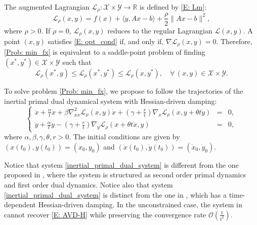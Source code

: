 \documentclass[pdflatex,sn-mathphys-num]{sn-jnl}
\theoremstyle{thmstyleone}
\theoremstyle{thmstyletwo}
\theoremstyle{thmstylethree}
\newcommand{\R}{\mathbb{R}}
\newcommand{\X}{\mathcal{X}}
\newcommand{\Y}{\mathcal{Y}}
\begin{document}
The augmented Lagrangian $\mathcal{L}_\rho:\X\times\Y\to\R$ is defined by \eqref{E: Lm}:
$$ \mathcal{L}_\rho(x,y) = f(x) + \langle y, Ax-b \rangle + \frac{\rho}{2}\| Ax-b \|^2, $$
where $\rho>0$. If $\rho=0$, $\mathcal{L}_\rho(x,y)$ reduces to the regular Lagrangian $\mathcal{L}(x,y)$. A point $(x,y)$ satisfies \eqref{E: opt_cond} if, and only if, $\nabla\mathcal{L}_\rho(x,y)=0$. Therefore, \eqref{Prob: min_fx} is equivalent to a saddle-point problem of finding $(x^*,y^*)\in\X\times\Y$ such that
$$ \mathcal{L}_\rho(x^*,y) \le \mathcal{L}_\rho(x^*,y^*) \le \mathcal{L}_\rho(x,y^*),\quad \forall\, (x,y)\in\X\times\Y.$$


To solve problem \eqref{Prob: min_fx}, we propose to follow the trajectories of the inertial primal dual dynamical system with Hessian-driven damping:  
\begin{equation}\label{inertial_primal_dual_system}\tag{PD-AVD-H}
\left\{
\begin{array}{rcl}
\ddot{x} + \frac{\alpha}{t}\dot{x} + \beta\nabla^2_{xx}\mathcal{L}_\rho \left( x, y \right) \dot{x} 
 + \left( \gamma + \frac{r}{t} \right) \nabla_x \mathcal{L}_\rho\left( x, y + \theta t \dot{y} \right) &=& 0, \\[2pt]
\ddot{y} + \frac{\alpha}{t}\dot{y} - \left( \gamma + \frac{r}{t} \right) \nabla_y \mathcal{L}_\rho\left( x + \theta t \dot{x}, y \right) &=& 0,
\end{array}
\right.
\end{equation}
where $\alpha,\beta,\gamma,\theta,r > 0$. The initial conditions are given by $\left( x(t_0), y(t_0) \right) = \left( x_0,y_0 \right)$ and $\left( \dot{x}(t_0),\dot{y}(t_0) \right) = \left( \dot{x}_0, \dot{y}_0 \right)$.

Notice that system \eqref{inertial_primal_dual_system} is different from the one proposed in \cite{He_2025}, where the system is structured as second order primal dynamics and first order dual dynamics. Notice also that system \eqref{inertial_primal_dual_system} is distinct from the one in \cite{Radu_2025_OGDA}, which has a time-dependent Hessian-driven damping. In the unconstrained case, the system in \cite{Radu_2025_OGDA} cannot recover \eqref{E: AVD-H} while preserving the convergence rate $\mathcal{O}\left( \frac{1}{t^2} \right)$.
\end{document}
